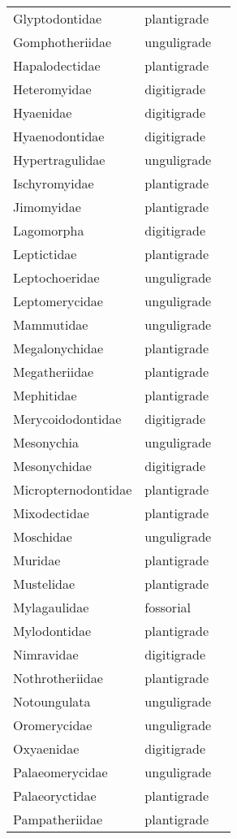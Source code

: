 \begin{center}
\begin{longtable}{ l l l }
    Glyptodontidae & plantigrade \\ 
    Gomphotheriidae & unguligrade \\ 
    Hapalodectidae & plantigrade \\ 
    Heteromyidae & digitigrade \\ 
    Hyaenidae & digitigrade \\ 
    Hyaenodontidae & digitigrade \\ 
    Hypertragulidae & unguligrade \\ 
    Ischyromyidae & plantigrade \\ 
    Jimomyidae & plantigrade \\ 
    Lagomorpha & digitigrade \\ 
    Leptictidae & plantigrade \\ 
    Leptochoeridae & unguligrade \\ 
    Leptomerycidae & unguligrade \\ 
    Mammutidae & unguligrade \\ 
    Megalonychidae & plantigrade \\ 
    Megatheriidae & plantigrade \\ 
    Mephitidae & plantigrade \\ 
    Merycoidodontidae & digitigrade \\ 
    Mesonychia & unguligrade \\ 
    Mesonychidae & digitigrade \\ 
    Micropternodontidae & plantigrade \\ 
    Mixodectidae & plantigrade \\ 
    Moschidae & unguligrade \\ 
    Muridae & plantigrade \\ 
    Mustelidae & plantigrade \\ 
    Mylagaulidae & fossorial \\ 
    Mylodontidae & plantigrade \\ 
    Nimravidae & digitigrade \\ 
    Nothrotheriidae & plantigrade \\ 
    Notoungulata & unguligrade \\ 
    Oromerycidae & unguligrade \\ 
    Oxyaenidae & digitigrade \\ 
    Palaeomerycidae & unguligrade \\ 
    Palaeoryctidae & plantigrade \\ 
    Pampatheriidae & plantigrade \\ 

\end{longtable}
\end{center}
